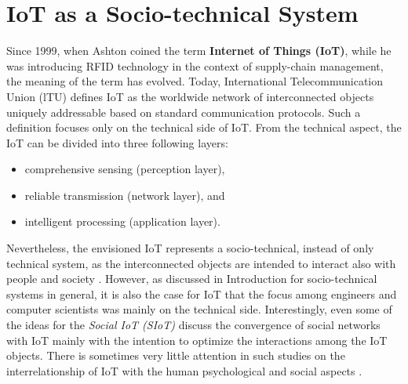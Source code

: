 \section{IoT as a Socio-technical System}
\label{sec:IoT_socio-techical}
Since 1999, when Ashton \cite{ashton2011internet} coined the term \textbf{Internet of Things (IoT)}, while he was introducing RFID technology in the context of supply-chain management, the meaning of the term has evolved. Today, International Telecommunication Union (lTU) defines IoT as the worldwide network of interconnected objects uniquely addressable based on standard communication protocols. Such a definition focuses only on the technical side of IoT. From the technical aspect, the IoT can be divided into three following layers:
\begin{itemize}
	\item comprehensive sensing (perception layer),
	\item reliable transmission (network layer), and
	\item intelligent processing (application layer).
\end{itemize}
Nevertheless, the envisioned IoT represents a socio-technical, instead of only technical system, as the interconnected objects are intended to interact also with people and society \cite{atzori2014smart}. However, as discussed in Introduction for socio-technical systems in general, it is also the case for IoT that the focus among engineers and computer scientists was mainly on the technical side. Interestingly, even some of the ideas for the \textit{Social IoT (SIoT)} \cite{atzori2012social,guinard2010sharing,atzori2014smart} discuss the convergence of social networks with IoT mainly with the intention to optimize the interactions among the IoT objects. There is sometimes very little attention in such studies on the interrelationship of IoT with the human psychological and social aspects \cite{atzori2012social,guinard2010sharing}. 

